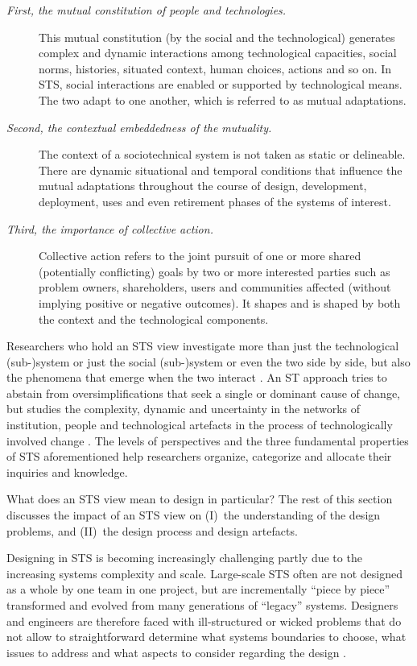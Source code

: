 \begin{description}
\item[\textit{First, the mutual constitution of people and technologies.}] 
This mutual constitution (by the social and the technological) generates complex and dynamic interactions among technological capacities, social norms, histories, situated context, human choices, actions and so on. In STS, social interactions are enabled or supported by technological means. The two adapt to one another, which is referred to as mutual adaptations. 
%
\item[\textit{Second, the contextual embeddedness of the mutuality.}] 
The context of a sociotechnical system is not taken as static or delineable. There are dynamic situational and temporal conditions that influence 
the mutual adaptations throughout the course of design, development, deployment, uses and even retirement phases of the systems of interest. 
%
\item[\textit{Third, the importance of collective action.}] 
Collective action refers to the joint pursuit of one or more shared (potentially conflicting) goals by two or more interested parties such as problem owners, shareholders, users  and communities affected (without implying positive or negative outcomes). It shapes and is shaped by both the context and the technological components. 
\end{description}
%
%
Researchers who hold an STS view investigate more than just the technological (sub-)system or just the social (sub-)system or even the two side by side, but also the phenomena that emerge when the two interact \cite{Lee2001}. An ST approach tries to abstain from oversimplifications that seek a single or dominant cause of change, but studies the complexity, dynamic and uncertainty in the networks of institution, people and technological artefacts in the process of technologically involved change \cite{Sawyer2014}. 
%
The levels of perspectives and the three fundamental properties of STS aforementioned help researchers organize, categorize and allocate their inquiries and knowledge. 

What does an STS view mean to design in particular? The rest of this section discusses the impact of an STS view on (I)~the understanding of the design problems, and (II)~the design process and design artefacts.

 Designing in STS is becoming increasingly challenging partly due to the increasing systems complexity and scale.  
Large-scale STS often are not designed as a whole by one team in one project, but are incrementally ``piece by piece'' transformed and evolved from many generations of ``legacy'' systems. Designers and engineers are therefore faced with ill-structured or wicked problems that do not allow to straightforward determine what systems boundaries to choose, what issues to address and what aspects to consider regarding the design \cite{Bots2007}. 

